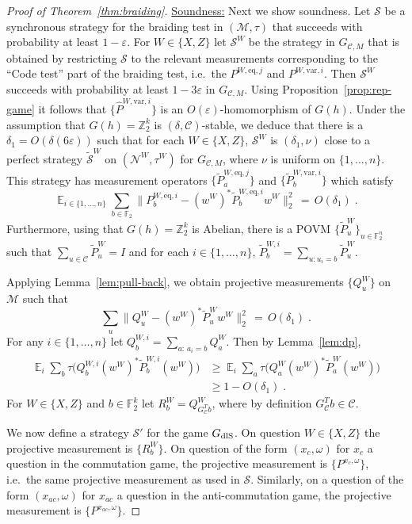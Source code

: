 \documentclass[11pt]{article}
\theoremstyle{definition}
\newcommand{\code}{\mathscr{C}}
\newcommand{\strategy}{\mathscr{S}}
\newcommand{\Id}{\ensuremath{I}}
\DeclareMathOperator*{\Expectation}{\mathbb{E}}
\newcommand{\Es}[1]{\Expectation_{#1}}
\newcommand{\field}{\mathbb{F}_2}
\newcommand{\dlS}{\ensuremath{\rm dlS}}
\newcommand{\F}{\ensuremath{\mathbb{F}}}
\newcommand{\Z}{\ensuremath{\mathbb{Z}}}
\newcommand{\mC}{\ensuremath{\mathcal{C}}}
\newcommand{\mM}{\ensuremath{\mathcal{M}}}
\newcommand{\eps}{\varepsilon}
\newcommand{\mN}{\mathcal{N}}
\newcommand{\eq}{\mathrm{eq}}
\newcommand{\var}{\mathrm{var}}
\begin{document}
\begin{proof}[Proof of Theorem~\ref{thm:braiding}]
\underline{Soundness:} Next we show soundness. Let $\strategy$ be a synchronous strategy for the braiding test  in  $(\mM,\tau)$ that succeeds with probability at least $1-\eps$. For $W\in\{X,Z\}$ let $\strategy^W$ be the strategy in $G_{\code,M}$ that is obtained by restricting $\strategy$ to the relevant measurements corresponding to the ``Code test'' part of the braiding test, i.e.\ the $P^{W,\eq,j}$ and $P^{W,\var,i}$.  Then $\strategy^W$ succeeds with probability at least $1-3\eps$ in $G_{\code,M}$. Using Proposition~\ref{prop:rep-game} it follows that $\{\widehat{P}^{W,\var,i}\}$ is an $O(\eps)$-homomorphism of $G(h)$. Under the assumption that $G(h)=\Z_2^k$ is $(\delta,\mC)$-stable, we deduce that there is a $\delta_1 = O({\delta(6\eps)})$ such that for each $W\in\{X,Z\}$, $\strategy^W$ is $(\delta_1,\nu)$ close to a perfect strategy $\tilde{\strategy}^W$ on $(\mN^W,\tau^W)$ for $G_{\code,M}$, where $\nu$ is uniform on $\{1,\ldots,n\}$. This strategy has measurement operators $\{ \tilde{P}^{W,\eq,j}_a\}$ and $\{\tilde{P}^{W,\var,i}_b\}$ which satisfy 
\begin{equation}\label{eq:main-0}
\Es{i\in\{1,\ldots,n\}}\sum_{b \in \F_2} \big\|P^{W,\eq,i}_b - (w^W)^* \tilde{P}_b^{W,\eq,i} w^W \big\|^2_2 \,=\, O(\delta_1)\;.
\end{equation}
Furthermore, using that $G(h)=\Z_2^k$ is Abelian, there is a  POVM $\{\tilde{P}^W_u\}_{u\in \field^n}$ such that $\sum_{u\in \code}\tilde{P}^W_u = \Id$ and for each $i\in \{1,\ldots,n\}$, $\tilde{P}^{W,i}_b = \sum_{u:u_i=b} \tilde{P}^W_u$.
 
Applying Lemma~\ref{lem:pull-back}, we obtain projective measurements $\{Q^W_u\}$ on $\mM$ such that 
\begin{equation}\label{eq:main-1}
\sum_u \big\|Q^W_u - (w^W)^* \tilde{P}_u^W w^W \big\|^2_2 \,=\, O(\delta_1)\;.
\end{equation}
For any $i\in\{1,\ldots,n\}$ let $Q^{W,i}_b = \sum_{a:\,a_i=b}  Q^W_a$. Then by Lemma~\ref{lem:dp},
\begin{align*}
\Es{i}\sum_b \tau\big( Q^{W,i}_b (w^W)^*\tilde{P}^{W,i}_b(w^W) \big)
&\geq \Es{i}\sum_a \tau\big( Q^{W}_a (w^W)^*\tilde{P}^{W}_a(w^W) \big)\\
&\geq 1-O(\delta_1)\;.
\end{align*}
For $W\in\{X,Z\}$ and $b\in \F_2^k$ let $R^W_b = Q^W_{G_\mC^T b}$, where by definition $G_\mC^T b\in \mC$. 

We now define a strategy $\strategy'$ for the game $G_{\dlS}$. On question $W\in \{X,Z\}$ the projective measurement is $\{R^W_b\}$. On question of the form $(x_c,\omega)$ for $x_c$ a question in the commutation game, the projective measurement is $\{P^{x_c,\omega}\}$, i.e.\ the same projective measurement as used in $\strategy$. Similarly, on a question of the form $(x_{ac},\omega)$ for $x_{ac}$ a question in the anti-commutation game, the projective measurement is $\{P^{x_{ac},\omega}\}$.


\end{proof}
\end{document}
